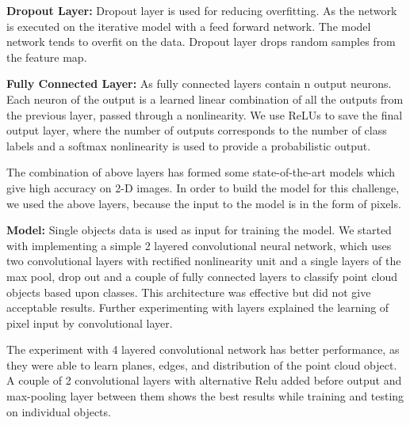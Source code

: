 \textbf{Dropout Layer:}
Dropout layer is used for reducing overfitting. As the network is executed on the iterative model with a feed forward network.
The model network tends to overfit on the data. Dropout layer drops random samples from the feature
map.

\textbf{Fully Connected Layer:}
As fully connected layers contain n output neurons. Each neuron of the output is a learned linear
combination of all the outputs from the previous layer, passed through a nonlinearity.
We use ReLUs to save the final output layer, where the number of outputs corresponds
to the number of class labels and a softmax nonlinearity is used to provide a probabilistic output.



The combination of above layers has formed some state-of-the-art models which give high accuracy on 2-D images.
In order to build the model for this challenge, we used the above layers, because the input to the model is in the form of pixels.

\textbf{Model:}
Single objects data is used as input for training the model. We started with implementing a simple 2 layered convolutional neural network, 
which uses two convolutional layers with rectified nonlinearity unit and a single layers of the max pool, 
drop out and a couple of fully connected layers to classify point cloud objects based upon classes. 
This architecture was effective but did not give acceptable results. Further experimenting with layers explained the learning of pixel input by convolutional layer.

The experiment with 4 layered convolutional network has better performance, as they were able to learn planes, edges, and distribution of the point cloud object. 
A couple of 2 convolutional layers with alternative Relu added before output and max-pooling layer between them shows the best results while training and testing on individual objects. 

